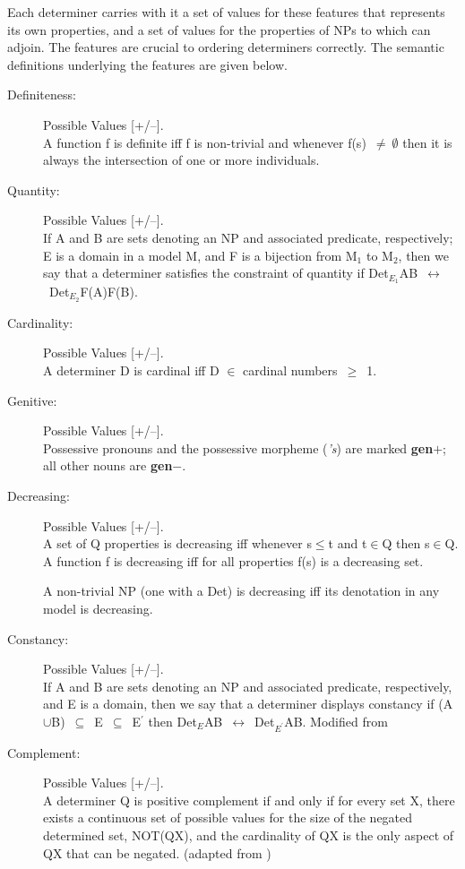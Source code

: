 Each determiner carries with it a set of values for these features
that represents its own properties, and a set of values for the
properties of NPs to which can adjoin. The features are crucial to
ordering determiners correctly. The semantic definitions
underlying the features are given below.

\begin{description}

\item[Definiteness:] Possible Values [+/--]. \\
A function f is definite iff f is non-trivial and whenever
f(s)~$\neq~\emptyset$ then it is always the intersection of one or
more individuals.  \cite{KeenanStavi86:LP}

\item[Quantity:]  Possible Values [+/--]. \\
If A and B are sets denoting an NP and associated predicate, respectively; E is
a domain in a model M, and F is a bijection from M$_{1}$ to M$_{2}$, then we
say that a determiner satisfies the constraint of quantity if
Det$_{E_{1}}$AB~$\leftrightarrow$~Det$_{E_{2}}$F(A)F(B). \cite{Partee90:BK}

\item[Cardinality:]  Possible Values [+/--]. \\
A determiner D is cardinal iff D $\in$ cardinal numbers~$\geq$~1.

\item[Genitive:]  Possible Values [+/--]. \\
Possessive pronouns and the possessive morpheme ({\it 's}) are marked {\bf
gen$+$}; all other nouns are {\bf gen$-$}.

\item[Decreasing:]  Possible Values [+/--]. \\
A set of Q properties is decreasing iff whenever s$\leq$t and t$\in$Q then
s$\in$Q. A function f is decreasing iff for all properties f(s) is a decreasing
set.

A non-trivial NP (one with a Det) is decreasing iff its denotation in any model
is decreasing. \cite{KeenanStavi86:LP}

\item[Constancy:] Possible Values [+/--]. \\
If A and B are sets denoting an NP and associated predicate, respectively, and
E is a domain, then we say that a determiner displays constancy if
(A$\cup$B)~$\subseteq$~E~$\subseteq$~E$^{\prime}$ then
Det$_{E}$AB~$\leftrightarrow$~Det$_{E^{\prime}}$AB. Modified from
\cite{Partee90:BK}

\item[Complement:] Possible Values [+/--]. \\
A determiner Q is positive complement if and only if for every set X, there
exists a continuous set of possible values for the size of the negated
determined set, NOT(QX), and the cardinality of QX is the only aspect of QX
that can be negated. (adapted from \cite{Mateyak97})

\end{description}

